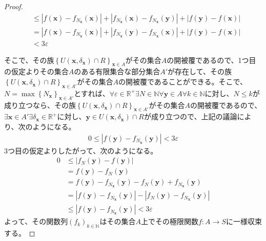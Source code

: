 \documentclass[dvipdfmx]{jsarticle}
\begin{document}
\begin{proof}
\begin{align*}
&\leq \left| f\left( \mathbf{x} \right) - f_{N_{\mathbf{x}}}\left( \mathbf{x} \right) \right| + \left| f_{N_{\mathbf{x}}}\left( \mathbf{x} \right) - f_{N_{\mathbf{x}}}\left( \mathbf{y} \right) \right| + \left| f\left( \mathbf{y} \right) - f\left( \mathbf{x} \right) \right|\\
&= \left| f\left( \mathbf{x} \right) - f_{N_{\mathbf{x}}}\left( \mathbf{x} \right) \right| + \left| f_{N_{\mathbf{x}}}\left( \mathbf{y} \right) - f_{N_{\mathbf{x}}}\left( \mathbf{x} \right) \right| + \left| f\left( \mathbf{y} \right) - f\left( \mathbf{x} \right) \right|\\
&< 3\varepsilon
\end{align*}\par
そこで、その族$\left\{ U\left( \mathbf{x},\delta_{\mathbf{x}} \right) \cap R \right\}_{\mathbf{x} \in A}$がその集合$A$の開被覆であるので、1つ目の仮定よりその集合$A$のある有限集合な部分集合$A'$が存在して、その族$\left\{ U\left( \mathbf{x},\delta_{\mathbf{x}} \right) \cap R \right\}_{\mathbf{x} \in A'}$がその集合$A$の開被覆であることができる。そこで、$N = \max\left\{ N_{\mathbf{x}} \right\}_{\mathbf{x} \in A'}$とすれば、$\forall\varepsilon \in \mathbb{R}^{+}\exists N \in \mathbb{N}\forall\mathbf{y} \in A\forall k \in \mathbb{N}$に対し、$N \leq k$が成り立つなら、その族$\left\{ U\left( \mathbf{x},\delta_{\mathbf{x}} \right) \cap R \right\}_{\mathbf{x} \in A'}$がその集合$A$の開被覆であるので、$\exists\mathbf{x} \in A'\exists\delta_{\mathbf{x}} \in \mathbb{R}^{+}$に対し、$\mathbf{y} \in U\left( \mathbf{x},\delta_{\mathbf{x}} \right) \cap R$が成り立つので、上記の議論により、次のようになる。
\begin{align*}
0 \leq \left| f\left( \mathbf{y} \right) - f_{N_{\mathbf{x}}}\left( \mathbf{y} \right) \right| < 3\varepsilon
\end{align*}
3つ目の仮定よりしたがって、次のようになる。
\begin{align*}
0 &\leq \left| f_{N}\left( \mathbf{y} \right) - f\left( \mathbf{y} \right) \right|\\
&= f\left( \mathbf{y} \right) - f_{N}\left( \mathbf{y} \right)\\
&= f\left( \mathbf{y} \right) - f_{N_{\mathbf{x}}}\left( \mathbf{y} \right) - f_{N}\left( \mathbf{y} \right) + f_{N_{\mathbf{x}}}\left( \mathbf{y} \right)\\
&= \left| f\left( \mathbf{y} \right) - f_{N_{\mathbf{x}}}\left( \mathbf{y} \right) \right| - \left| f_{N}\left( \mathbf{y} \right) - f_{N_{\mathbf{x}}}\left( \mathbf{y} \right) \right|\\
&\leq \left| f\left( \mathbf{y} \right) - f_{N_{\mathbf{x}}}\left( \mathbf{y} \right) \right| < 3\varepsilon
\end{align*}
よって、その関数列$\left( f_{k} \right)_{k \in \mathbb{N}}$はその集合$A$上でその極限関数$f:A \rightarrow S$に一様収束する。
\end{proof}
\end{document}
